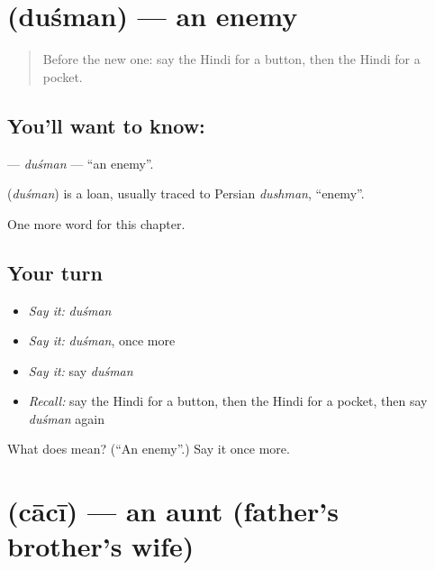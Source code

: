 \section[\texorpdfstring{\hi{दुश्मन} (duśman)}{दुश्मन (duśman)}]{ (duśman) — an enemy}

\label{lesson:HI-C188-dusman}



\begin{quote}
Before the new one: say the Hindi for a button, then the Hindi for a pocket.
\end{quote}

\subsection*{You'll want to know: }
\textbf{} — \emph{duśman} — \textquotedblleft{}an enemy\textquotedblright{}.

\begin{cousinweb}
\textbf{} (\emph{duśman}) is a loan, usually traced to Persian \emph{dushman}, \textquotedblleft{}enemy\textquotedblright{}.
\end{cousinweb}

\begin{grammarlens}[title={What you've built}]
One more word for this chapter.
\end{grammarlens}

\subsection*{Your turn}
\begin{itemize}
\raggedright
  \item \emph{Say it:} \emph{duśman}
  \item \emph{Say it:} \emph{duśman}, once more
  \item \emph{Say it:} say \emph{duśman}
  \item \emph{Recall:} say the Hindi for a button, then the Hindi for a pocket, then say \emph{duśman} again
\end{itemize}

\begin{tcolorbox}[breakable,colback=teal!4,colframe=teal!35!black,title={Before you move on}]
What does  mean? (\textquotedblleft{}An enemy\textquotedblright{}.) Say it once more.
\end{tcolorbox}
\section[\texorpdfstring{\hi{चाची} (cācī)}{चाची (cācī)}]{ (cācī) — an aunt (father's brother's wife)}

